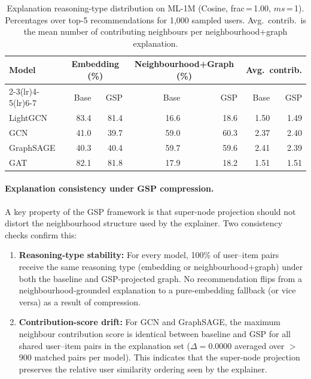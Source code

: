 \begin{table}[ht]
\centering
\caption{Explanation reasoning-type distribution on ML-1M (Cosine, frac\,=\,1.00, $ms$\,=\,1). Percentages over top-5 recommendations for 1{,}000 sampled users. Avg.\ contrib.\ is the mean number of contributing neighbours per neighbourhood+graph explanation.}
\label{tab:explanation_types}
\setlength{\tabcolsep}{6pt}
\begin{tabular}{l r r r r r r}
\toprule
\multirow{2}{*}{Model} & \multicolumn{2}{c}{Embedding (\%)} & \multicolumn{2}{c}{Neighbourhood+Graph (\%)} & \multicolumn{2}{c}{Avg.\ contrib.} \\
\cmidrule(lr){2-3}\cmidrule(lr){4-5}\cmidrule(lr){6-7}
 & Base & GSP & Base & GSP & Base & GSP \\
\midrule
LightGCN   & 83.4 & 81.4 & 16.6 & 18.6 & 1.50 & 1.49 \\
GCN        & 41.0 & 39.7 & 59.0 & 60.3 & 2.37 & 2.40 \\
GraphSAGE  & 40.3 & 40.4 & 59.7 & 59.6 & 2.41 & 2.39 \\
GAT        & 82.1 & 81.8 & 17.9 & 18.2 & 1.51 & 1.51 \\
\bottomrule
\end{tabular}
\end{table}

\paragraph{Explanation consistency under GSP compression.}
A key property of the GSP framework is that super-node projection should not distort the neighbourhood structure used by the explainer. Two consistency checks confirm this:

\begin{enumerate}
    \item \textbf{Reasoning-type stability:} For every model, 100\% of user--item pairs receive the same reasoning type (embedding or neighbourhood+graph) under both the baseline and GSP-projected graph. No recommendation flips from a neighbourhood-grounded explanation to a pure-embedding fallback (or vice versa) as a result of compression.

    \item \textbf{Contribution-score drift:} For GCN and GraphSAGE, the maximum neighbour contribution score is identical between baseline and GSP for all shared user--item pairs in the explanation set ($\Delta = 0.0000$ averaged over $>$900 matched pairs per model). This indicates that the super-node projection preserves the relative user similarity ordering seen by the explainer.
\end{enumerate}

